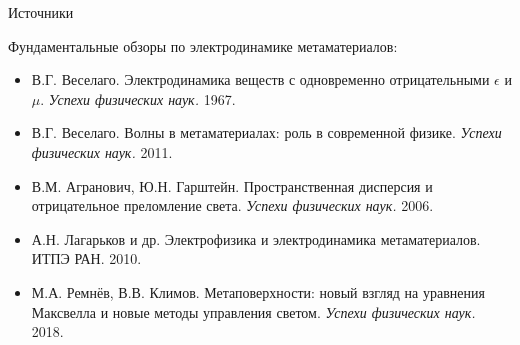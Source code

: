 \documentclass[9pt, compress, xcolor=table]{beamer}
\begin{document}
\begin{frame}{Источники}
    
    Фундаментальные обзоры по электродинамике метаматериалов:
    \begin{itemize}
        \item В.Г. Веселаго. Электродинамика веществ с одновременно отрицательными $\epsilon$ и $\mu$. \textit{Успехи физических наук.} 1967.
        \item В.Г. Веселаго. Волны в метаматериалах: роль в современной физике. \textit{Успехи физических наук.} 2011.
        \item В.М. Агранович, Ю.Н. Гарштейн. Пространственная дисперсия и отрицательное преломление света. \textit{Успехи физических наук.} 2006.
        \item А.Н. Лагарьков и др. Электрофизика и электродинамика метаматериалов. ИТПЭ РАН. 2010.
        \item М.А. Ремнёв, В.В. Климов. Метаповерхности: новый взгляд на уравнения Максвелла и новые методы управления светом. \textit{Успехи физических наук.} 2018.
    \end{itemize}
    
    
\end{frame}
\end{document}
